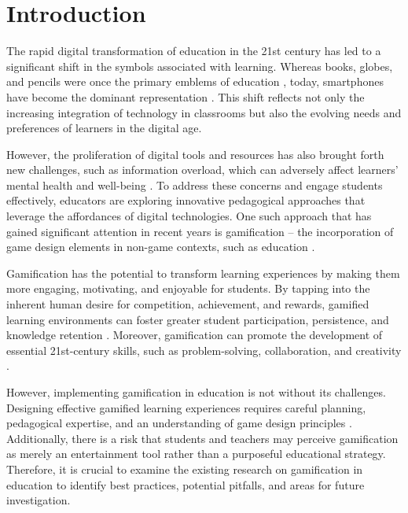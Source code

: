 \documentclass[a4paper,fleqn]{cas-sc}
\begin{document}
\maketitle

\section{Introduction}

The rapid digital transformation of education in the 21st century has led to a significant shift in the symbols associated with learning. Whereas books, globes, and pencils were once the primary emblems of education \citep{symbolismhub.com}, today, smartphones have become the dominant representation \citep[p.~15]{UNESCO2023}. This shift reflects not only the increasing integration of technology in classrooms but also the evolving needs and preferences of learners in the digital age.

However, the proliferation of digital tools and resources has also brought forth new challenges, such as information overload, which can adversely affect learners' mental health and well-being \cite[p.~83]{UNESCO2023}. To address these concerns and engage students effectively, educators are exploring innovative pedagogical approaches that leverage the affordances of digital technologies. One such approach that has gained significant attention in recent years is gamification -- the incorporation of game design elements in non-game contexts, such as education \citep{Deterding2011}.

Gamification has the potential to transform learning experiences by making them more engaging, motivating, and enjoyable for students. By tapping into the inherent human desire for competition, achievement, and rewards, gamified learning environments can foster greater student participation, persistence, and knowledge retention \citep{Sailer2017}. Moreover, gamification can promote the development of essential 21st-century skills, such as problem-solving, collaboration, and creativity \citep{Qian2016}.

However, implementing gamification in education is not without its challenges. Designing effective gamified learning experiences requires careful planning, pedagogical expertise, and an understanding of game design principles \citep[p.~77]{UNESCO2023}. Additionally, there is a risk that students and teachers may perceive gamification as merely an entertainment tool rather than a purposeful educational strategy. Therefore, it is crucial to examine the existing research on gamification in education to identify best practices, potential pitfalls, and areas for future investigation.
\end{document}
